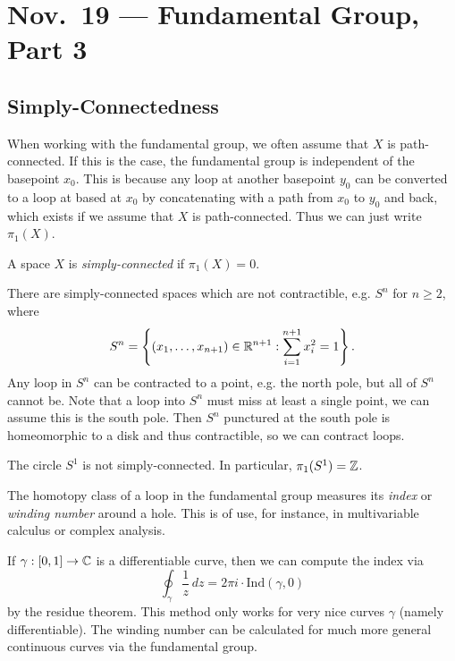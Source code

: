 \chapter{Nov.~19 --- Fundamental Group, Part 3}

\section{Simply-Connectedness}
\begin{remark}
  When working with the fundamental group, we
  often assume that $X$ is path-connected. If this
  is the case, the fundamental group is independent
  of the basepoint $x_0$. This is because any
  loop at another basepoint $y_0$ can be converted
  to a loop at based at $x_0$ by concatenating with
  a path from $x_0$ to $y_0$ and back, which exists
  if we assume that $X$ is path-connected.
  Thus we can just write $\pi_1(X)$.
\end{remark}

\begin{definition}
  A space $X$ is \emph{simply-connected} if
  $\pi_1(X) = 0$.
\end{definition}

\begin{remark}
  There are simply-connected spaces
  which are not contractible, e.g. $S^n$ for
  $n \ge 2$, where
  \[
    S^n = \left\{(x_1, \dots, x_{n + 1}) \in \mathbb{R}^{n + 1} : \sum_{i = 1}^{n + 1} x_i^2 = 1\right\}.
  \]
  Any loop in $S^n$ can be contracted to a point,
  e.g. the north pole, but all of $S^n$ cannot be.
  Note that a loop into $S^n$ must miss at least
  a single point, we can assume this is the south
  pole. Then $S^n$ punctured at the south pole is
  homeomorphic to a disk and thus contractible, so
  we can contract loops.
\end{remark}

\begin{prop}
  The circle $S^1$ is not simply-connected. In
  particular, $\pi_1(S^1) = \mathbb{Z}$.
\end{prop}

\begin{remark}
  The homotopy class of a loop in the fundamental
  group measures its \emph{index} or
  \emph{winding number} around a hole. This is
  of use, for instance, in multivariable calculus
  or complex analysis.
\end{remark}

\begin{remark}
  If $\gamma : [0, 1] \to \mathbb{C}$ is a differentiable
  curve, then we can compute the index via
  \[
    \oint_{\gamma} \frac{1}{z}\, dz
    = 2\pi i \cdot \mathrm{Ind}(\gamma, 0)
  \]
  by the residue theorem. This method only works for
  very nice curves $\gamma$ (namely differentiable).
  The winding number can be calculated for much
  more general continuous curves via the fundamental
  group.
\end{remark}

